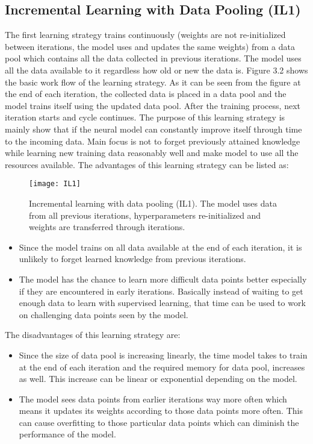 \subsection{Incremental Learning with Data Pooling (IL1)}

The first learning strategy trains continuously (weights are not re-initialized between iterations, the model uses and updates the same weights) from a data pool which contains all the data collected in previous iterations. The model uses all the data available to it regardless how old or new the data is. Figure 3.2 shows the basic work flow of the learning strategy. As it can be seen from the figure at the end of each iteration, the collected data is placed in a data pool and the model trains itself using the updated data pool. After the training process, next iteration starts and cycle continues. The purpose of this learning strategy is mainly show that if the neural model can constantly improve itself through time to the incoming data. Main focus is not to forget previously attained knowledge while learning new training data reasonably well and make model to use all the resources available. The advantages of this learning strategy can be listed as:

\begin{figure}[t]
\texttt{[image: IL1]}
\centering
\caption{Incremental learning with data pooling (IL1). The model uses data from all previous iterations, hyperparameters re-initialized and weights are transferred through iterations.}
\end{figure}

\begin{itemize}

  \item Since the model trains on all data available at the end of each iteration, it is unlikely to forget learned knowledge from previous iterations.
  \item The model has the chance to learn more difficult data points better especially if they are encountered in early iterations. Basically instead of waiting to get enough data to learn with supervised learning, that time can be used to work on challenging data points seen by the model.

\end{itemize}

The disadvantages of this learning strategy are:

\begin{itemize}

  \item Since the size of data pool is increasing linearly, the time model takes to train at the end of each iteration and the required memory for data pool, increases as well. This increase can be linear or exponential depending on the model.
  \item The model sees data points from earlier iterations way more often which means it updates its weights according to those data points more often. This can cause overfitting to those particular data points which can diminish the performance of the model.

\end{itemize}

